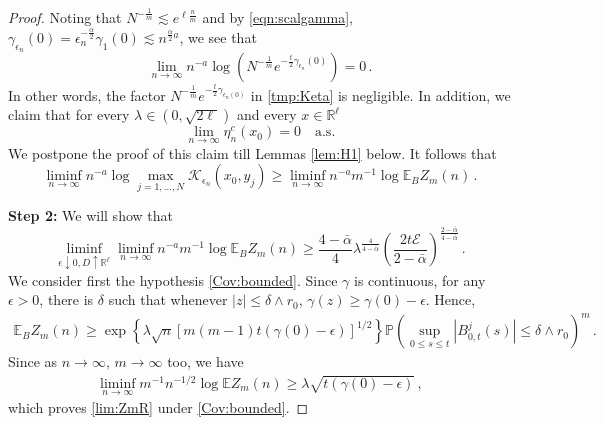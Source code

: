 \documentclass[12pt,reqno]{amsart}
\theoremstyle{remark}
\newcommand{\1}{\mathbf{1}}
\def\RR{\mathbb{R}}
\def\EE{\mathbb{E}}
\def\PP{\mathbb{P}}
\def\K{\mathcal{K}}
\def\cee{{\mathcal E}}
\def\lt{\left}
\def\rt{\right}
\begin{document}
\begin{proof}
		Noting that $N^{-\frac1m} \lesssim e^{\ell \frac nm} $ and by \eqref{eqn:scalgamma}, $\gamma_{\epsilon_n}(0)=\epsilon_n^{-\frac \alpha2}\gamma_1(0)\lesssim n^{\frac \alpha2a}$, we see that
		\begin{equation}\label{eq: diag goto 0}
			\lim_{n\to\infty}n^{-a}\log\lt(N^{-\frac1m}e^{-\frac t2 \gamma_{\epsilon_n}(0)}\rt)=0\,.
		\end{equation}
		In other words, the factor $N^{-\frac1m}e^{-\frac t2 \gamma_{\epsilon_n(0)}}$ in \eqref{tmp:Keta} is negligible.
		In addition, we claim that for every $\lambda\in(0,\sqrt{2\ell})$ and every $x\in\RR^\ell$
		\begin{equation}\label{claim.eta}
		 	\lim_{n\to\infty}\eta_n^c(x_0)=0\quad \mathrm{a.s.}
		 \end{equation}
		We postpone the proof of this claim till Lemmas \ref{lem:H1} below. It follows that
		\begin{equation}\label{tmp:step2}
			\liminf_{n\to\infty}n^{-a}\log \max_{j=1, \dots,  N}\K_{\epsilon_n}(x_0,y_j)
			\ge \liminf_{n\to\infty}n^{-a}m^{-1}\log\EE_B Z_m(n)\,.
		\end{equation}
		
		\textbf{Step 2:} We will show that
		\begin{equation}\label{lim:ZmR}
				\liminf_{\epsilon\downarrow0,D\uparrow\RR^\ell}\liminf_{n\to\infty} n^{-a}m^{-1} \log\EE_BZ_m(n)\ge   \frac{4- \bar\alpha}4 \lambda^{\frac4{4- \bar\alpha}} \lt(\frac{2t\cee}{2- \bar\alpha} \rt)^{\frac{2- \bar\alpha}{4- \bar\alpha}} \,.
		\end{equation}
		We consider first the hypothesis \ref{Cov:bounded}. Since $\gamma$ is continuous, for any $\epsilon>0$, there is $\delta$ such that whenever $|z|\leq \delta\wedge r_0$, $\gamma(z) \geq \gamma(0)-\epsilon$. Hence,
		\begin{eqnarray*}
		\EE_B Z_m(n) \geq \exp \left\{ \lambda \sqrt{n} \left[ m(m-1) t \left( \gamma(0)-\epsilon \right) \right]^{1/2} \right\} \PP \left( \sup_{0 \leq s \leq t} |B_{0,t}^j (s)|\leq \delta\wedge r_0 \right)^m\,.
		\end{eqnarray*}
		Since as $n \to \infty$, $m \to \infty$ too, we have 
		\begin{eqnarray*}
		 \liminf_{n \to \infty} m^{-1} n^{-1/2} \log \EE Z_m(n) \geq \lambda\sqrt{ t (\gamma(0)-\epsilon)}\,,
		\end{eqnarray*}
		which proves \eqref{lim:ZmR} under \ref{Cov:bounded}.  


\end{proof}
\end{document}
